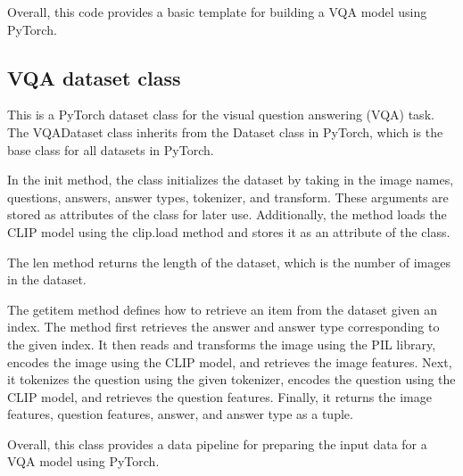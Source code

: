 \documentclass{report}
\begin{document}
Overall, this code provides a basic template for building a VQA model using PyTorch.

\subsection{VQA dataset class}
This is a PyTorch dataset class for the visual question answering (VQA) task. The VQADataset class inherits from the Dataset class in PyTorch, which is the base class for all datasets in PyTorch.

In the init method, the class initializes the dataset by taking in the image names, questions, answers, answer types, tokenizer, and transform. These arguments are stored as attributes of the class for later use. Additionally, the method loads the CLIP model using the clip.load method and stores it as an attribute of the class.

The len method returns the length of the dataset, which is the number of images in the dataset.

The getitem method defines how to retrieve an item from the dataset given an index. The method first retrieves the answer and answer type corresponding to the given index. It then reads and transforms the image using the PIL library, encodes the image using the CLIP model, and retrieves the image features. Next, it tokenizes the question using the given tokenizer, encodes the question using the CLIP model, and retrieves the question features. Finally, it returns the image features, question features, answer, and answer type as a tuple.

Overall, this class provides a data pipeline for preparing the input data for a VQA model using PyTorch.
\end{document}
